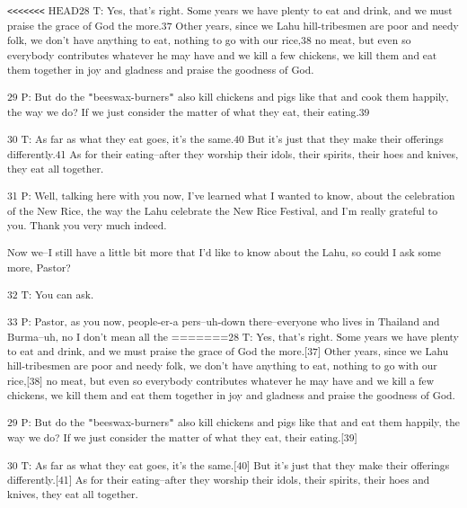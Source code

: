 \textsuperscript{\texttt{<}\texttt{<}\texttt{<}\texttt{<}\texttt{<}\texttt{<}\texttt{<}
HEAD28 T: Yes, that's right. Some years we have plenty to eat and drink, and we
must praise the grace of God the more.37 Other years, since we Lahu hill-tribesmen
are poor and needy folk, we don't have anything to eat, nothing to go with our
rice,38 no meat, but even so everybody contributes whatever he may have and we
kill a few chickens, we kill them and eat them together in joy and gladness and
praise the goodness of God. }

\textsuperscript{29 P: But do the \texttt{"}beeswax-burners\texttt{"} also kill
chickens and pigs like that and cook them happily, the way we do? If we just consider
the matter of what they eat, their eating.39}

\textsuperscript{30 T: As far as what they eat goes, it's the same.40 But it's
just that they make their offerings differently.41 As for their eating--after they
worship their idols, their spirits, their hoes and knives, they eat all together.
}

\textsuperscript{31 P: Well, talking here with you now, I've learned what I wanted
to know, about the celebration of the New Rice, the way the Lahu celebrate the
New Rice Festival, and I'm really grateful to you. Thank you very much indeed.
}

\textsuperscript{Now we--I still have a little bit more that I'd like to know about
the Lahu, so could I ask some more, Pastor?}

\textsuperscript{32 T: You can ask.}

\textsuperscript{33 P: Pastor, as you now, people-er-a pers--uh-down there--everyone
who lives in Thailand and Burma--uh, no I don't mean all the =======28 T: Yes,
that's right. Some years we have plenty to eat and drink, and we must praise the
grace of God the more.[37] Other years, since we Lahu hill-tribesmen are poor and
needy folk, we don't have anything to eat, nothing to go with our rice,[38] no
meat, but even so everybody contributes whatever he may have and we kill a few
chickens, we kill them and eat them together in joy and gladness and praise the
goodness of God. }

\textsuperscript{29 P: But do the \texttt{"}beeswax-burners\texttt{"} also kill
chickens and pigs like that and eat them happily, the way we do? If we just consider
the matter of what they eat, their eating.[39]}

\textsuperscript{30 T: As far as what they eat goes, it's the same.[40] But it's
just that they make their offerings differently.[41] As for their eating--after
they worship their idols, their spirits, their hoes and knives, they eat all together.
}

